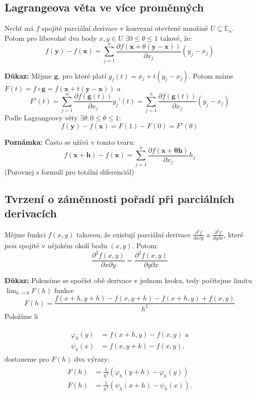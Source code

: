 \documentclass[../main.tex]{subfiles}
\begin{document}
\subsection{Lagrangeova věta ve více proměnných}
\hspace{1.2mm}
\noindent
Nechť má $f$ spojité parciální derivace v konvexní otevřené množině $U \subseteq \mathbb{E}_{n}$.
Potom pro libovolné dva body $x,y \in U$ $\exists 0 \leq \theta \leq 1$ takové, že:
\[ f(\mathbf{y}) - f(\mathbf{x}) =
\sum^{n}_{j=1} \frac{\partial f(\mathbf{x} + \theta (\mathbf{y}-\mathbf{x}))}{\partial x_j}(y_j - x_j) \]

\noindent
\textbf{Důkaz:}
Mějme $\mathbf{g}$, pro které platí $g_j(t) = x_j + t(y_j - x_j)$.
Potom máme $F(t) = f \circ \mathbf{g} = f(\mathbf{x} + t(\mathbf{y}-\mathbf{x}))$ a
\[ F'(t) = \sum^{n}_{j=1} \frac{\partial f(\mathbf{g}(t))}{\partial x_j}g_j'(t) =
\sum^{n}_{j=1} \frac{\partial f(\mathbf{g}(t))}{\partial x_j}(y_j - x_j)  \]
Podle Lagrangeovy věty $\exists \theta : 0 \leq \theta \leq 1$:
\[ f(\mathbf{y}) - f(\mathbf{x}) = F(1) - F(0) = F'(\theta) \]

\noindent
\textbf{Poznámka:}
Často se užívá v tomto tvaru:
\[ f(\mathbf{x} + \mathbf{h}) - f(\mathbf{x}) =
\sum^{n}_{j=1} \frac{\partial f(\mathbf{x + \theta \mathbf{h}})}{\partial x_j}h_j \]
(Porovnej s formulí pro totální diferenciál)

\subsection{Tvrzení o záměnnosti pořadí při parciálních derivacích}
\hspace{1.2mm}
\noindent
Mějme funkci $f(x,y)$ takovou, že existují parciální derivace
$\frac{\partial ^2 f}{\partial x \partial y}$ a $\frac{\partial ^2 f}{\partial y \partial x}$, které
jsou spojité v nějakém okolí bodu $(x,y)$. Potom:
\[ \frac{\partial ^2 f(x,y)}{\partial x \partial y} = \frac{\partial ^2 f(x,y)}{\partial y \partial x} \]

\noindent
\textbf{Důkaz:} Pokusíme se spočíst obě derivace v jednom kroku, tedy počítejme limitu $\lim_{h\rightarrow 0} F(h)$ funkce
\[F(h) = \frac{f(x+h,y+h) - f(x,y+h) - f(x+h,y) + f(x,y)}{h^2}\]
Položíme li 

\begin{align*} 
\begin{split}
\varphi_h(y) & = f(x+h,y) - f(x,y)\text{ a}\\
\psi_k(x) & = f(x,y+k) - f(x,y),
\end{split}
\end{align*}
dostaneme pro $F(h)$ dva výrazy:
\begin{align*} 
\begin{split}
F(h) & = \frac{1}{h^2} (\varphi_h(y+h) - \varphi_h(y))\\
F(h) & = \frac{1}{h^2} (\psi_h(x+h)-\psi_h(x)).
\end{split}
\end{align*}
\end{document}

